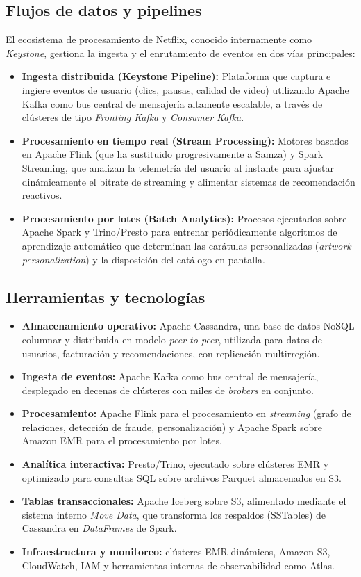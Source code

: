 \documentclass[12pt,a4paper]{article}
\begin{document}
\subsection{Flujos de datos y pipelines}
El ecosistema de procesamiento de Netflix, conocido internamente como
\textit{Keystone}, gestiona la ingesta y el enrutamiento de eventos en dos
vías principales:
\begin{itemize}
    \item \textbf{Ingesta distribuida (Keystone Pipeline):} Plataforma que captura e ingiere eventos de usuario (clics, pausas, calidad de video) utilizando Apache Kafka como bus central de mensajería altamente escalable, a través de clústeres de tipo \textit{Fronting Kafka} y \textit{Consumer Kafka}.
    \item \textbf{Procesamiento en tiempo real (Stream Processing):} Motores basados en Apache Flink (que ha sustituido progresivamente a Samza) y Spark Streaming, que analizan la telemetría del usuario al instante para ajustar dinámicamente el bitrate de streaming y alimentar sistemas de recomendación reactivos.
    \item \textbf{Procesamiento por lotes (Batch Analytics):} Procesos ejecutados sobre Apache Spark y Trino/Presto para entrenar periódicamente algoritmos de aprendizaje automático que determinan las carátulas personalizadas (\textit{artwork personalization}) y la disposición del catálogo en pantalla.
\end{itemize}

\subsection{Herramientas y tecnologías}
\begin{itemize}
    \item \textbf{Almacenamiento operativo:} Apache Cassandra, una base de datos NoSQL columnar y distribuida en modelo \textit{peer-to-peer}, utilizada para datos de usuarios, facturación y recomendaciones, con replicación multirregión.
    \item \textbf{Ingesta de eventos:} Apache Kafka como bus central de mensajería, desplegado en decenas de clústeres con miles de \textit{brokers} en conjunto.
    \item \textbf{Procesamiento:} Apache Flink para el procesamiento en \textit{streaming} (grafo de relaciones, detección de fraude, personalización) y Apache Spark sobre Amazon EMR para el procesamiento por lotes.
    \item \textbf{Analítica interactiva:} Presto/Trino, ejecutado sobre clústeres EMR y optimizado para consultas SQL sobre archivos Parquet almacenados en S3.
    \item \textbf{Tablas transaccionales:} Apache Iceberg sobre S3, alimentado mediante el sistema interno \textit{Move Data}, que transforma los respaldos (SSTables) de Cassandra en \textit{DataFrames} de Spark.
    \item \textbf{Infraestructura y monitoreo:} clústeres EMR dinámicos, Amazon S3, CloudWatch, IAM y herramientas internas de observabilidad como Atlas.
\end{itemize}
\end{document}
